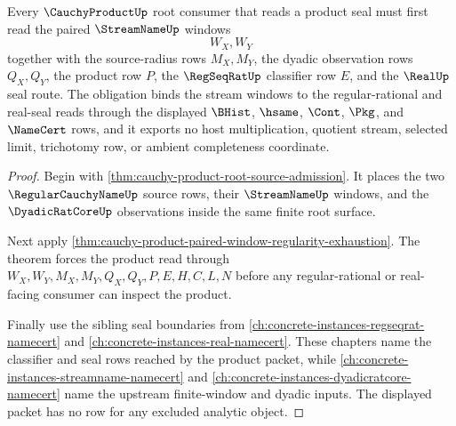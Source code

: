 \begin{theorem}
\label{thm:cauchy-product-stream-seal-obligation}
Every $\CauchyProductUp$ root consumer that reads a product seal must first read the paired $\StreamNameUp$ windows
$$
W_X,W_Y
$$
together with the source-radius rows $M_X,M_Y$, the dyadic observation rows $Q_X,Q_Y$, the product row $P$, the $\RegSeqRatUp$ classifier row $E$, and the $\RealUp$ seal route. The obligation binds the stream windows to the regular-rational and real-seal reads through the displayed $\BHist$, $\hsame$, $\Cont$, $\Pkg$, and $\NameCert$ rows, and it exports no host multiplication, quotient stream, selected limit, trichotomy row, or ambient completeness coordinate.
\end{theorem}
\begin{proof}
Begin with \autoref{thm:cauchy-product-root-source-admission}. It places the two $\RegularCauchyNameUp$ source rows, their $\StreamNameUp$ windows, and the $\DyadicRatCoreUp$ observations inside the same finite root surface.

Next apply \autoref{thm:cauchy-product-paired-window-regularity-exhaustion}. The theorem forces the product read through $W_X,W_Y,M_X,M_Y,Q_X,Q_Y,P,E,H,C,L,N$ before any regular-rational or real-facing consumer can inspect the product.

Finally use the sibling seal boundaries from \autoref{ch:concrete-instances-regseqrat-namecert} and \autoref{ch:concrete-instances-real-namecert}. These chapters name the classifier and seal rows reached by the product packet, while \autoref{ch:concrete-instances-streamname-namecert} and \autoref{ch:concrete-instances-dyadicratcore-namecert} name the upstream finite-window and dyadic inputs. The displayed packet has no row for any excluded analytic object.
\end{proof}

